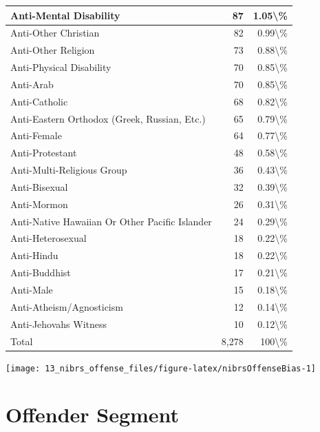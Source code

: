 \documentclass[
]{krantz}
\let\origfigure\figure
\let\endorigfigure\endfigure
\renewenvironment{figure}[1][2] {
    \expandafter\origfigure\expandafter[H]
} {
    \endorigfigure
}
\begin{document}
\begin{longtable}[t]{l|r|r}
\hline
Anti-Mental Disability & 87 & 1.05\textbackslash{}\%\\
\hline
Anti-Other Christian & 82 & 0.99\textbackslash{}\%\\
\hline
Anti-Other Religion & 73 & 0.88\textbackslash{}\%\\
\hline
Anti-Physical Disability & 70 & 0.85\textbackslash{}\%\\
\hline
Anti-Arab & 70 & 0.85\textbackslash{}\%\\
\hline
Anti-Catholic & 68 & 0.82\textbackslash{}\%\\
\hline
Anti-Eastern Orthodox (Greek, Russian, Etc.) & 65 & 0.79\textbackslash{}\%\\
\hline
Anti-Female & 64 & 0.77\textbackslash{}\%\\
\hline
Anti-Protestant & 48 & 0.58\textbackslash{}\%\\
\hline
Anti-Multi-Religious Group & 36 & 0.43\textbackslash{}\%\\
\hline
Anti-Bisexual & 32 & 0.39\textbackslash{}\%\\
\hline
Anti-Mormon & 26 & 0.31\textbackslash{}\%\\
\hline
Anti-Native Hawaiian Or Other Pacific Islander & 24 & 0.29\textbackslash{}\%\\
\hline
Anti-Heterosexual & 18 & 0.22\textbackslash{}\%\\
\hline
Anti-Hindu & 18 & 0.22\textbackslash{}\%\\
\hline
Anti-Buddhist & 17 & 0.21\textbackslash{}\%\\
\hline
Anti-Male & 15 & 0.18\textbackslash{}\%\\
\hline
Anti-Atheism/Agnosticism & 12 & 0.14\textbackslash{}\%\\
\hline
Anti-Jehovahs Witness & 10 & 0.12\textbackslash{}\%\\
\hline
Total & 8,278 & 100\textbackslash{}\%\\
\hline
\end{longtable}

\begin{figure}

{\centering \texttt{[image: 13\_nibrs\_offense\_files/figure-latex/nibrsOffenseBias-1]} 

}

\caption{The annual percent of offenses reported as having a bias motivation (i.e. hate crime), 1993-2022.}\label{fig:nibrsOffenseBias}
\end{figure}

\chapter{Offender Segment}\label{offender-segment-1}
\end{document}

